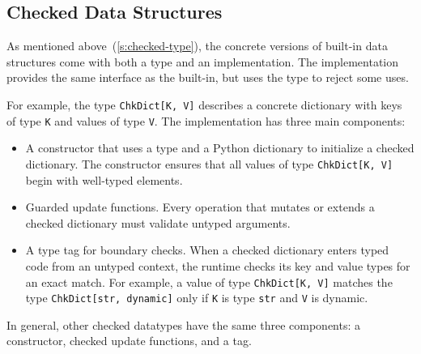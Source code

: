 \documentclass[english,cleveref,submission]{programming}
\newcommand{\code}[1]{\texttt{#1}}
\begin{document}


\subsection{Checked Data Structures}
\label{s:chkdict-impl}

As mentioned above~(\cref{s:checked-type}), the concrete versions of built-in data structures
come with both a type and an implementation.
The implementation provides the same interface as the built-in,
but uses the type to reject some uses.

For example, the type \code{ChkDict[K, V]} describes a concrete dictionary
with keys of type \code{K} and values of type \code{V}.
The implementation has three main components:
\begin{itemize}
  \item
    A constructor that uses a type and a Python dictionary
    to initialize a checked dictionary.
    The constructor ensures that all values of type \code{ChkDict[K, V]}
    begin with well-typed elements.
  \item
    Guarded update functions.
    Every operation that mutates or extends a checked dictionary must
    validate untyped arguments.
  \item
    A type tag for boundary checks.
    When a checked dictionary enters typed code from an untyped context,
    the runtime checks its key and value types for an exact match.
    For example, a value of type \code{ChkDict[K, V]} matches the type
    \code{ChkDict[str, dynamic]} only if \code{K} is type \code{str}
    and \code{V} is dynamic.
\end{itemize}
%
In general, other checked datatypes have the same three components:
a constructor, checked update functions, and a tag.
\end{document}
